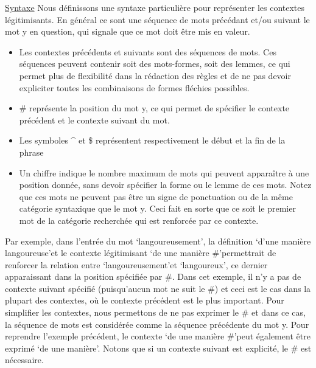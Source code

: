 \documentclass[a4paper, 12pt]{article}
\begin{document}
\underline{Syntaxe}\newline
Nous définissons une syntaxe particulière pour représenter les contextes légitimisants. En général ce sont une séquence de mots précédant et/ou suivant le mot y en question, qui signale que ce mot doit être mis en valeur.\newline

\begin{itemize}
    \item{Les contextes précédents et suivants sont des séquences de mots. Ces séquences peuvent contenir soit des mots-formes, soit des lemmes, ce qui permet plus de flexibilité dans la rédaction des règles et de ne pas devoir expliciter toutes les combinaisons de formes fléchies possibles.}

    \item{\# représente la position du mot y, ce qui permet de spécifier le contexte précédent et le contexte suivant du mot.}

    \item{Les symboles \string^ et \$ représentent respectivement le début et la fin de la phrase}

    \item{Un chiffre indique le nombre maximum de mots qui peuvent apparaître à une position donnée, sans devoir spécifier la forme ou le lemme de ces mots. Notez que ces mots ne peuvent pas être un signe de ponctuation ou de la même catégorie syntaxique que le mot y. Ceci fait en sorte que ce soit le premier mot de la catégorie recherchée qui est renforcée par ce contexte.}

\end{itemize}

Par exemple, dans l'entrée du mot \lq{langoureusement}\rq, la définition \lq{d'une manière langoureuse}\rq et le contexte légitimisant \lq{de une manière \#}\rq permettrait de renforcer la relation entre \lq langoureusement\rq et \lq langoureux\rq, ce dernier apparaissant dans la position spécifiée par \#. Dans cet exemple, il n'y a pas de contexte suivant spécifié (puisqu'aucun mot ne suit le \#) et ceci est le cas dans la plupart des contextes, où le contexte précédent est le plus important. Pour simplifier les contextes, nous permettons de ne pas exprimer le \# et dans ce cas, la séquence de mots est considérée comme la séquence précédente du mot y. Pour reprendre l'exemple précédent, le contexte \lq{de une manière \#}\rq peut également être exprimé \lq{de une manière}\rq. Notons que si un contexte suivant est explicité, le \# est nécessaire.
\end{document}
